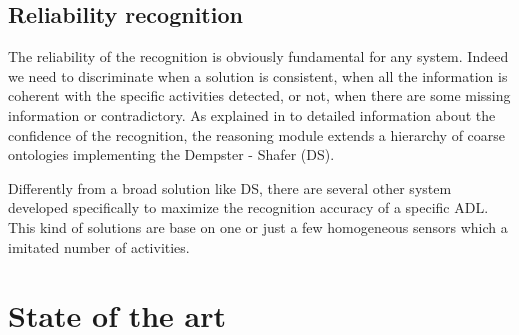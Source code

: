 \documentclass{thesisreport}
\begin{document}
\section{Reliability recognition}
The reliability of the recognition is obviously fundamental for any system. Indeed we need to discriminate when a solution is consistent, when all the information is coherent with the specific activities detected, or not, when there are some missing information or contradictory.
As explained in \cite{sentz2002combination} to detailed information about the confidence of the recognition, the reasoning module extends a hierarchy of coarse ontologies implementing the Dempster - Shafer (DS). 

Differently from a broad solution like DS, there are several other system developed specifically to maximize the recognition accuracy of a specific ADL. This kind of solutions are base on one or just a few homogeneous sensors which a imitated number of activities.  

 \chapter{State of the art}
 
 

  
 
 
 
 
\end{document}
